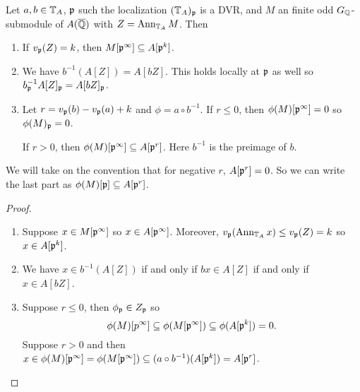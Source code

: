 \documentclass[11pt, proquest]{uwthesis}
\begin{document}
\begin{lemma}\label{lem:com_alg}
    Let $a,b\in \mathbb{T}_A$, $\mathfrak{p}$ such the localization $(\mathbb{T}_A)_{\mathfrak{p}}$ is a DVR, and
    $M$ an finite odd $G_{\mathbb{Q}}$-submodule of $A(\overline{\mathbb{Q}})$ with $Z=\operatorname{Ann}_{\mathbb{T}_A} M$.
    Then
    \begin{enumerate}
        \item
            If $v_{\mathfrak{p}}(Z) = k$, then $M[\mathfrak{p}^\infty]\subseteq A[\mathfrak{p}^k]$.
        \item
            We have $b^{-1}(A[Z])=A[bZ]$. This holds locally at $\mathfrak{p}$ as well so
            $b_{\mathfrak{p}} ^{-1} A[Z]_{\mathfrak{p}} = A[bZ]_{\mathfrak{p}}$.
        \item
            Let $r=v_{\mathfrak{p}}(b)-v_{\mathfrak{p}}(a)+k$ and $\phi=a\circ b^{-1}$. If $r\leq
            0$, then $\phi(M)[\mathfrak{p}^\infty]=0$ so $\phi(M)_{\mathfrak{p}}=0$.

            If $r>0$, then
            $\phi(M)[\mathfrak{p}^\infty]\subseteq A[\mathfrak{p}^r]$. Here $b^{-1}$ is the
            preimage of $b$.
    \end{enumerate}
    We will take on the convention that for negative $r$, $A[\mathfrak{p}^r]=0$. So we can
    write the last part as $\phi(M)[\mathfrak{p}]\subseteq A[\mathfrak{p}^r]$.
\end{lemma}
\begin{proof}
    \mbox{}
    \begin{enumerate}
        \item
            Suppose $x\in M[\mathfrak{p}^\infty]$ so $x\in A[\mathfrak{p}^\infty]$. Moreover,
            $v_{\mathfrak{p}}(\operatorname{Ann}_{\mathbb{T}_A} x) \leq v_{\mathfrak{p}}(Z) = k$ so $x\in A[\mathfrak{p}^k]$.
        \item
            We have $x\in b^{-1}(A[Z])$ if and only if $bx \in A[Z]$ if and
            only if $x\in A[bZ]$.
        \item
            Suppose $r\leq 0$, then $\phi_{\mathfrak{p}} \in Z_{\mathfrak{p}}$ so
            \[
                \phi(M)[p^\infty]\subseteq \phi(M[\mathfrak{p}^\infty])
                \subseteq \phi(A[\mathfrak{p}^k]) = 0.
            \]
            Suppose $r>0$ and then $x\in \phi(M)[\mathfrak{p}^\infty] =
            \phi(M[\mathfrak{p}^\infty])\subseteq (a\circ
            b^{-1})(A[\mathfrak{p}^k])=A[\mathfrak{p}^r]$.
    \end{enumerate}
\end{proof}
\end{document}
